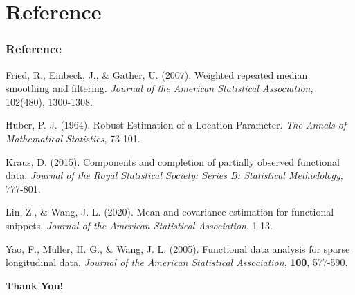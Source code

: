 \documentclass[9pt]{beamer}
\begin{document}
\section*{Reference}
\begin{frame}[allowframebreaks]
	\frametitle<presentation>{Reference}
	\renewcommand{\section}[2]{}   %
	\begin{thebibliography}{9}
		\footnotesize
        
        Fried, R., Einbeck, J., \& Gather, U. (2007). Weighted repeated median smoothing and filtering. {\em Journal of the American Statistical Association}, 102(480), 1300-1308.
        
        Huber, P. J. (1964). Robust Estimation of a Location Parameter. {\em The Annals of Mathematical Statistics}, 73-101.
        
        Kraus, D. (2015). Components and completion of partially observed functional data. {\em Journal of the Royal Statistical Society: Series B: Statistical Methodology}, 777-801.
        
        Lin, Z., \& Wang, J. L. (2020). Mean and covariance estimation for functional snippets. {\em Journal of the American Statistical Association}, 1-13.
        
        Yao, F., Müller, H. G., \& Wang, J. L. (2005). Functional data analysis for sparse longitudinal data. {\em Journal of the American Statistical Association}, {\bf 100}, 577-590.
	\end{thebibliography}	
\end{frame}


\begin{frame}
	\begin{center}
		\huge
		\textbf{Thank You!}
	\end{center}
\end{frame}
\end{document}
